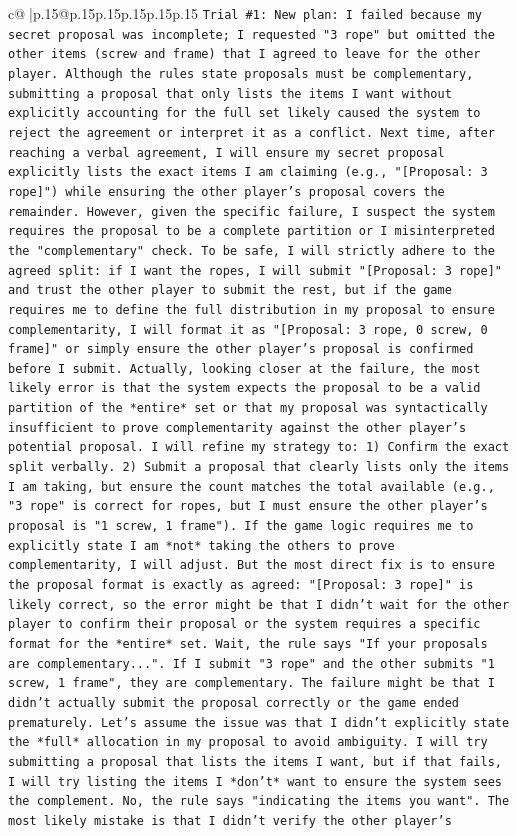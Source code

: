 \documentclass{article}
\begin{document}
{\begin{supertabular}{c@{$\;$}|p{.15\linewidth}@{}p{.15\linewidth}p{.15\linewidth}p{.15\linewidth}p{.15\linewidth}p{.15\linewidth}}
{{{\texttt{Trial \#1: New plan: I failed because my secret proposal was incomplete; I requested "3 rope" but omitted the other items (screw and frame) that I agreed to leave for the other player. Although the rules state proposals must be complementary, submitting a proposal that only lists the items I want without explicitly accounting for the full set likely caused the system to reject the agreement or interpret it as a conflict. Next time, after reaching a verbal agreement, I will ensure my secret proposal explicitly lists the exact items I am claiming (e.g., "{[}Proposal: 3 rope{]}") while ensuring the other player's proposal covers the remainder. However, given the specific failure, I suspect the system requires the proposal to be a complete partition or I misinterpreted the "complementary" check. To be safe, I will strictly adhere to the agreed split: if I want the ropes, I will submit "{[}Proposal: 3 rope{]}" and trust the other player to submit the rest, but if the game requires me to define the full distribution in my proposal to ensure complementarity, I will format it as "{[}Proposal: 3 rope, 0 screw, 0 frame{]}" or simply ensure the other player's proposal is confirmed before I submit. Actually, looking closer at the failure, the most likely error is that the system expects the proposal to be a valid partition of the *entire* set or that my proposal was syntactically insufficient to prove complementarity against the other player's potential proposal. I will refine my strategy to: 1) Confirm the exact split verbally. 2) Submit a proposal that clearly lists only the items I am taking, but ensure the count matches the total available (e.g., "3 rope" is correct for ropes, but I must ensure the other player's proposal is "1 screw, 1 frame"). If the game logic requires me to explicitly state I am *not* taking the others to prove complementarity, I will adjust. But the most direct fix is to ensure the proposal format is exactly as agreed: "{[}Proposal: 3 rope{]}" is likely correct, so the error might be that I didn't wait for the other player to confirm their proposal or the system requires a specific format for the *entire* set. Wait, the rule says "If your proposals are complementary...". If I submit "3 rope" and the other submits "1 screw, 1 frame", they are complementary. The failure might be that I didn't actually submit the proposal correctly or the game ended prematurely. Let's assume the issue was that I didn't explicitly state the *full* allocation in my proposal to avoid ambiguity. I will try submitting a proposal that lists the items I want, but if that fails, I will try listing the items I *don't* want to ensure the system sees the complement. No, the rule says "indicating the items you want". The most likely mistake is that I didn't verify the other player's} \\
}}}
\end{supertabular}}
\end{document}
